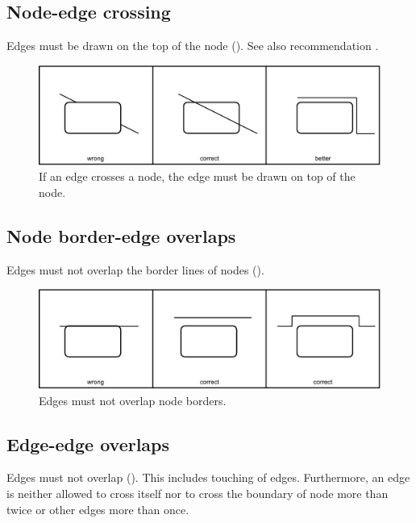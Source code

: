 \subsection{Node-edge crossing}\label{crosEdNoRe}

Edges must be drawn on the top of the node (). See also recommendation .

\begin{figure}[htb]
  \centering
  \includegraphics[scale=0.8]{images/build/layout_node_edge.pdf}
  \caption{If an edge crosses a node, the edge must be drawn on top
  of the node.}\label{fig:layout2}
\end{figure}

\subsection{Node border-edge overlaps}

Edges must not overlap the border lines of nodes ().

\begin{figure}[htb]
  \centering
  \includegraphics[scale=0.8]{images/build/layout_node_border_edge.pdf}
  \caption{Edges must not overlap node borders.}\label{fig:layout3}
\end{figure}

\subsection{Edge-edge overlaps}

Edges must not overlap (). This includes touching of edges.
Furthermore, an edge is neither allowed to cross itself nor to cross
the boundary of node more than twice or other edges more than once.

